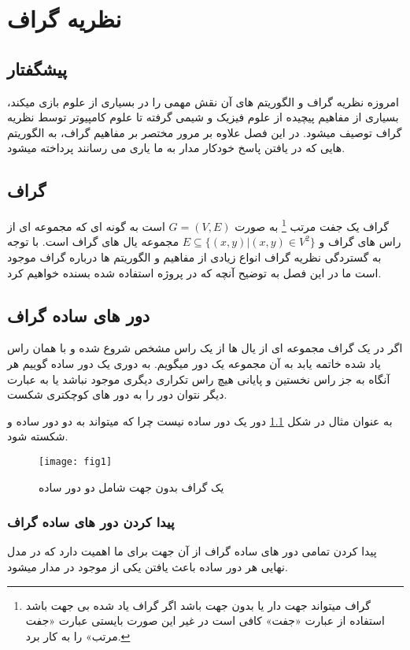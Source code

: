 \chapter{نظریه گراف}
\section{پیشگفتار} 
امروزه نظریه گراف و الگوریتم های آن نقش مهمی را در بسیاری از علوم بازی میکند، بسیاری از مفاهیم پیچیده از علوم فیزیک و شیمی گرفته تا علوم کامپیوتر توسط نظریه گراف توصیف میشود.
در این فصل علاوه بر مرور مختصر بر مفاهیم گراف، به الگوریتم هایی که در یافتن پاسخ خودکار مدار به ما یاری می رسانند پرداخته میشود.

\section{گراف}
گراف یک جفت مرتب
\footnote{
	گراف میتواند جهت دار یا بدون جهت باشد اگر گراف یاد شده بی جهت باشد استفاده از عبارت 
	«جفت» کافی است
	در غیر این صورت بایستی عبارت «جفت مرتب» را به کار برد. 
}
 به صورت
 $G = (V,E)$
 است به گونه ای که
 مجموعه ای از راس های گراف و
 $ E \subseteq \{(x,y)|(x,y) \in V^2 \}  $
 مجموعه یال های گراف است.
 با توجه به گستردگی نظریه گراف انواع زیادی از مفاهیم و الگوریتم ها درباره گراف موجود است
 ما در این فصل به توضیح آنچه که در پروژه استفاده شده بسنده خواهیم کرد.
\section{دور های ساده گراف}
اگر در یک گراف مجموعه ای از یال ها از یک راس مشخص شروع شده و با همان راس یاد شده خاتمه یابد
به آن مجموعه یک دور میگویم.
به دوری یک دور ساده
 گوییم هر آنگاه به جز راس نخستین و پایانی هیچ راس تکراری دیگری موجود نباشد یا به
 عبارت دیگر نتوان دور را به دور های کوچکتری شکست.
 
 به عنوان مثال در شکل
 \ref{fig:fig1} 
 دور
 یک دور ساده نیست چرا که میتواند به دو دور ساده
  و
   شکسته شود.
 
 \begin{figure}[ht]
 	\centerline{\texttt{[image: fig1]}}
 	\caption{یک گراف بدون جهت شامل دو دور ساده}
 	\label{fig:fig1}
 \end{figure}
\subsection{پیدا کردن دور های ساده گراف}
پیدا کردن تمامی دور های ساده گراف از آن جهت برای ما اهمیت دارد که در مدل نهایی هر دور ساده
باعث یافتن یکی از
موجود در مدار میشود.


